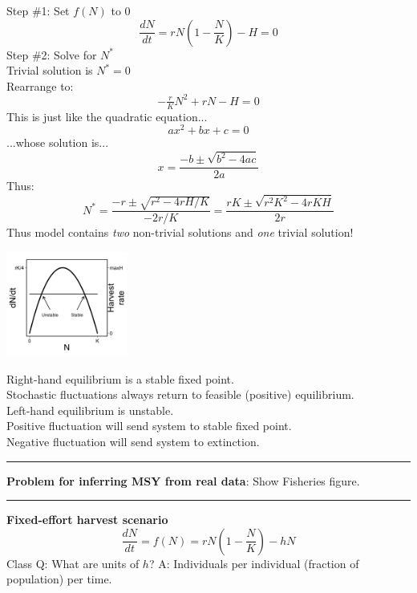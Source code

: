 \documentclass{article}
\newcommand{\note}[1]{\colorbox{gray!30}{#1}}
\newcommand{\ind}{\-\hspace{1cm}}
\begin{document}
Step \#1: Set $f(N)$ to $0$
\begin{equation*}
	\frac{dN}{dt}=rN\left(1-\frac{N}{K}\right)-H=0
\end{equation*}
Step \#2: Solve for $N^*$\\
\ind Trivial solution is $N^*=0$\\
\ind Rearrange to:
\begin{equation*}
	-\tfrac{r}{K}N^2+rN-H=0
\end{equation*}
\ind This is just like the quadratic equation...
\begin{equation*}
	ax^2 + bx + c = 0
\end{equation*}
\ind ...whose solution is...
\begin{equation*}
	x=\frac{-b \pm \sqrt{b^2-4ac}}{2a}
\end{equation*}
\ind Thus:
\begin{equation*}
	N^*=\frac{-r \pm \sqrt{r^2 - 4rH/K}}{-2r/K}=\frac{rK \pm \sqrt{r^2 K^2 - 4rKH}}{2r}
\end{equation*}
Thus model contains \emph{two} non-trivial solutions  and \emph{one} trivial solution!
\begin{center}
\includegraphics[width=4cm]{figs/dNdt_harvestquota.jpg}
\end{center}

Right-hand equilibrium is a stable fixed point.\\
\ind Stochastic fluctuations always return to feasible (positive) equilibrium.\\
Left-hand equilibrium is unstable.\\
\ind Positive fluctuation will send system to stable fixed point.\\
\ind Negative fluctuation will send system to extinction.\\

\rule[0.5ex]{\linewidth}{1pt}

\textbf{Problem for inferring MSY from real data}: \note{Show Fisheries figure.}

\rule[0.5ex]{\linewidth}{1pt}

\textbf{Fixed-effort harvest scenario}
\begin{equation*}
	\frac{dN}{dt}=f(N)=rN\left(1-\frac{N}{K}\right)-hN
\end{equation*}
\note{Class Q:} What are units of $h$? \note{A:} Individuals per individual (fraction of population) per time.
\vspace{0.5cm}
\end{document}
